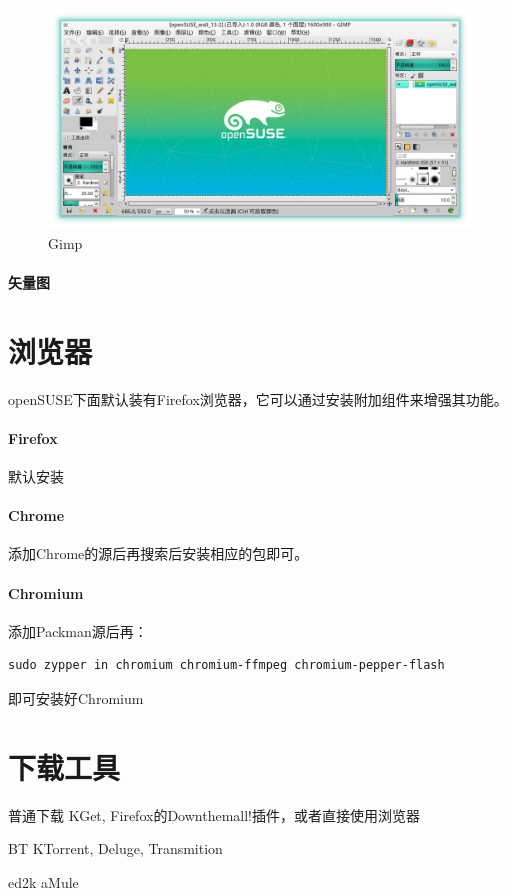 \begin{figure}[htbp!]
\centering
\includegraphics[width=\textwidth]{./pic/gimp.png} 
\caption{Gimp}\label{gimp}
\end{figure}

\paragraph{矢量图}
\section{浏览器}
openSUSE下面默认装有Firefox浏览器，它可以通过安装附加组件来增强其功能。

\paragraph{Firefox}默认安装

\paragraph{Chrome}添加Chrome的源后再搜索后安装相应的包即可。

\paragraph{Chromium}添加Packman源后再：
\begin{Verbatim}[formatcom=\color{codec}]
    sudo zypper in chromium chromium-ffmpeg chromium-pepper-flash
\end{Verbatim}
即可安装好Chromium
\section{下载工具}
\begin{compactdesc}
 \item[普通下载] KGet, Firefox的Down\-them\-all!插件，或者直接使用浏览器
 \item[BT] KTorrent, Deluge, Transmition
 \item[ed2k] aMule
\end{compactdesc}

